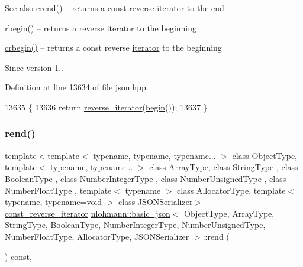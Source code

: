\begin{DoxySeeAlso}{See also}
\hyperlink{classnlohmann_1_1basic__json_a5795b029dbf28e0cb2c7a439ec5d0a88}{crend()} -- returns a const reverse \hyperlink{classnlohmann_1_1basic__json_a099316232c76c034030a38faa6e34dca}{iterator} to the \hyperlink{classnlohmann_1_1basic__json_a13e032a02a7fd8a93fdddc2fcbc4763c}{end} 

\hyperlink{classnlohmann_1_1basic__json_a1ef93e2006dbe52667294f5ef38b0b10}{rbegin()} -- returns a reverse \hyperlink{classnlohmann_1_1basic__json_a099316232c76c034030a38faa6e34dca}{iterator} to the beginning 

\hyperlink{classnlohmann_1_1basic__json_a1e0769d22d54573f294da0e5c6abc9de}{crbegin()} -- returns a const reverse \hyperlink{classnlohmann_1_1basic__json_a099316232c76c034030a38faa6e34dca}{iterator} to the beginning
\end{DoxySeeAlso}
\begin{DoxySince}{Since}
version 1.. 
\end{DoxySince}


Definition at line 13634 of file json.\+hpp.


\begin{DoxyCode}
13635     \{
13636         \textcolor{keywordflow}{return} \hyperlink{classnlohmann_1_1basic__json_ac223d5560c2b05a208c88de67376c5f2}{reverse\_iterator}(\hyperlink{classnlohmann_1_1basic__json_a0ff28dac23f2bdecee9564d07f51dcdc}{begin}());
13637     \}
\end{DoxyCode}
\mbox{\label{classnlohmann_1_1basic__json_a4f73d4cee67ea328d785979c22af0ae1}} 
\subsubsection{\texorpdfstring{rend()}{rend()}\hspace{0.1cm}{\footnotesize\ttfamily [2/2]}}
{\footnotesize\ttfamily template$<$template$<$ typename, typename, typename... $>$ class Object\+Type, template$<$ typename, typename... $>$ class Array\+Type, class String\+Type , class Boolean\+Type , class Number\+Integer\+Type , class Number\+Unsigned\+Type , class Number\+Float\+Type , template$<$ typename $>$ class Allocator\+Type, template$<$ typename, typename=void $>$ class J\+S\+O\+N\+Serializer$>$ \\
\hyperlink{classnlohmann_1_1basic__json_a72be3c24bfa24f0993d6c11af03e7404}{const\+\_\+reverse\+\_\+iterator} \hyperlink{classnlohmann_1_1basic__json}{nlohmann\+::basic\+\_\+json}$<$ Object\+Type, Array\+Type, String\+Type, Boolean\+Type, Number\+Integer\+Type, Number\+Unsigned\+Type, Number\+Float\+Type, Allocator\+Type, J\+S\+O\+N\+Serializer $>$\+::rend (\begin{DoxyParamCaption}{ }\end{DoxyParamCaption}) const\hspace{0.3cm}{\ttfamily [inline]}, {\ttfamily [noexcept]}}



